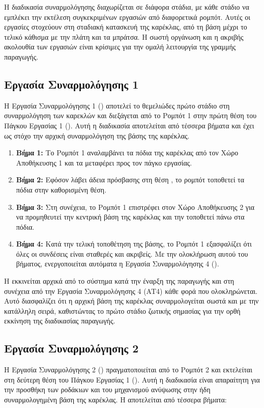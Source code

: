 Η διαδικασία συναρμολόγησης διαχωρίζεται σε διάφορα στάδια, με κάθε στάδιο να εμπλέκει την εκτέλεση συγκεκριμένων εργασιών από διαφορετικά ρομπότ. Αυτές οι εργασίες στοχεύουν στη σταδιακή κατασκευή της καρέκλας, από τη βάση μέχρι το τελικό κάθισμα με την πλάτη και τα μπράτσα. Η σωστή οργάνωση και η ακριβής ακολουθία των εργασιών είναι κρίσιμες για την ομαλή λειτουργία της γραμμής παραγωγής.

\subsection{Εργασία Συναρμολόγησης 1}
\noindent Η Εργασία Συναρμολόγησης 1 () αποτελεί το θεμελιώδες πρώτο στάδιο στη συναρμολόγηση των καρεκλών  και διεξάγεται από το Ρομπότ 1 στην πρώτη θέση του Πάγκου Εργασίας 1 (). Αυτή η διαδικασία αποτελείται από τέσσερα βήματα και έχει ως στόχο την αρχική συναρμολόγηση της βάσης της καρέκλας.

\begin{enumerate}
    \item \textbf{Βήμα 1:} Το Ρομπότ 1 αναλαμβάνει τα πόδια της καρέκλας από τον Χώρο Αποθήκευσης 1 και τα μεταφέρει προς τον πάγκο εργασίας.
    \item \textbf{Βήμα 2:} Εφόσον λάβει άδεια πρόσβασης στη θέση , το ρομπότ τοποθετεί τα πόδια στην καθορισμένη θέση.
    \item \textbf{Βήμα 3:} Στη συνέχεια, το Ρομπότ 1 επιστρέφει στον Χώρο Αποθήκευσης 2 για να προμηθευτεί την κεντρική βάση της καρέκλας και την τοποθετεί πάνω στα πόδια.
    \item \textbf{Βήμα 4:} Κατά την τελική τοποθέτηση της βάσης, το Ρομπότ 1 εξασφαλίζει ότι όλες οι συνδέσεις είναι σταθερές και ακριβείς. Με την ολοκλήρωση αυτού του βήματος, ενεργοποιείται αυτόματα η Εργασία Συναρμολόγησης 4 ().
\end{enumerate}

Η  εκκινείται αρχικά από το σύστημα κατά την έναρξη της παραγωγής και στη συνέχεια από την Εργασία Συναρμολόγησης 4 (AT4) κάθε φορά που ολοκληρώνεται. Αυτό διασφαλίζει ότι η αρχική βάση της καρέκλας συναρμολογείται σωστά και με την κατάλληλη σειρά, καθιστώντας το πρώτο στάδιο ζωτικής σημασίας για την ορθή εκκίνηση της διαδικασίας παραγωγής.

\subsection{Εργασία Συναρμολόγησης 2}
\noindent Η Εργασία Συναρμολόγησης 2 () πραγματοποιείται από το Ρομπότ 2 και εκτελείται στη δεύτερη θέση του Πάγκου Εργασίας 1 (). Αυτή η διαδικασία είναι απαραίτητη για την προσθήκη των ροδάκιων και του μηχανισμού ανύψωσης στην ήδη συναρμολογημένη βάση της καρέκλας. Η  αποτελείται από τέσσερα βήματα:

